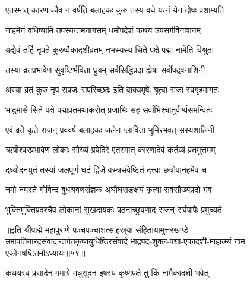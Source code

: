\twolineshloka
{एतस्मात् कारणाच्चैव न वर्षति बलाहकः}
{कुरु तस्य वधे यत्नं येन दोषः प्रशाम्यति}%


\twolineshloka
{नाहमेनं वधिष्यामि तपस्यन्तमनागसम्}
{धर्मोपदेशं कथय उपसर्गविनाशनम्}%


\twolineshloka
{यद्येवं तर्हि नृपते कुरुष्वैकादशीव्रतम्}
{नभस्यस्य सिते पक्षे पद्मा नामेति विश्रुता}%

\twolineshloka
{तस्या व्रतप्रभावेण सुवृष्टिर्भविता ध्रुवम्}
{सर्वसिद्धिप्रदा ह्येषा सर्वोपद्रवनाशिनी}%

\twolineshloka
{अस्या व्रतं कुरु नृप सप्रजः सपरिच्छदः}
{इति वाक्यमृषेः श्रुत्वा राजा स्वगृहमागतः}%

\twolineshloka
{भाद्रमासे सिते पक्षे पद्माव्रतमथाकरोत्}
{प्रजाभिः सह सर्वाभिश्चातुर्वर्ण्यसमन्वितः}%

\twolineshloka
{एवं व्रते कृते राजन् प्रववर्ष बलाहकः}
{जलेन प्लाविता भूमिरभवत् सस्यशालिनी}%

\twolineshloka
{ऋषीश्वरप्रभावेण लोकाः सौख्यं प्रपेदिरे}
{एतस्मात् कारणादेवं कर्तव्यं व्रतमुत्तमम्}%

\twolineshloka
{दध्योदनयुतं तस्यां जलपूर्णं घटं द्विजे}
{वस्त्रसंवेष्टितं दत्त्वा छत्रोपानहमेव च}%

\twolineshloka
{नमो नमस्ते गोविन्द बुधश्रवणसंज्ञक}
{अघौघसङ्क्षयं कृत्वा सर्वसौख्यप्रदो भव}%

\twolineshloka
{भुक्तिमुक्तिप्रदश्चैव लोकानां सुखदायकः}
{पठनाच्छ्रवणाद् राजन् सर्वपापैः प्रमुच्यते}%

॥इति श्रीपाद्मे महापुराणे पञ्चपञ्चाशत्साहस्र्यां संहितायामुत्तरखण्डे उमापतिनारदसंवादान्तर्गतकृष्णयुधिष्ठिरसंवादे भाद्रपद-शुक्ल-पद्मा-एकादशी-माहात्म्यं नाम एकोनषष्टितमोऽध्यायः॥५९॥

\genMangalaShloka

\hyperref[sec:ekadashi_mahatmyam_padma_puranam]{\closesub}
\clearpage

\label{sec:padma-ashvina-krishnendira}

\ganapatyadiDhyanam
\padmaPuranam



\twolineshloka
{कथयस्व प्रसादेन ममाग्रे मधुसूदन}
{इषस्य कृष्णपक्षे तु किं नामैकादशी भवेत्}%


